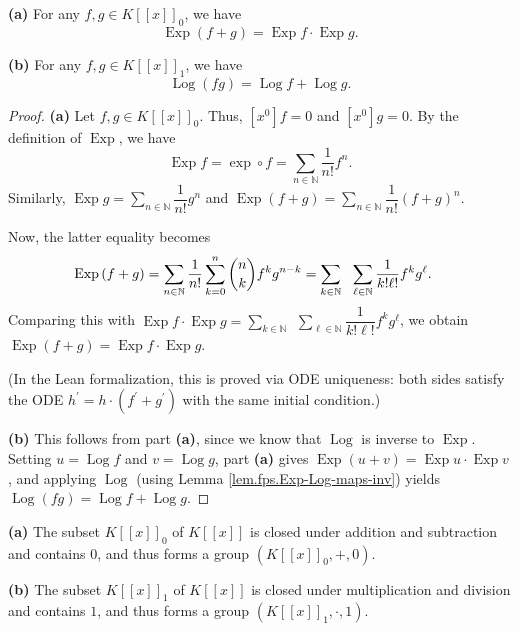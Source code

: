 \begin{lemma}
\label{lem.fps.Exp-Log-additive}
\leantarget
\leanok
\textbf{(a)} For any $f,g\in K\left[\left[
x\right]\right]_{0}$, we have
\[
\operatorname{Exp}\left(f+g\right)=\operatorname{Exp}f\cdot
\operatorname{Exp}g.
\]

\textbf{(b)} For any $f,g\in K\left[\left[x\right]\right]_{1}$, we
have
\[
\operatorname{Log}\left(fg\right)=\operatorname{Log}
f+\operatorname{Log}g.
\]
\end{lemma}

\begin{proof}
\textbf{(a)} Let $f,g\in K\left[\left[x\right]\right]_{0}$. Thus, $\left[
x^{0}\right]f=0$ and $\left[x^{0}\right]g=0$. By the definition of $\operatorname{Exp}$, we have
\[
\operatorname{Exp}f=\exp\circ f=\sum_{n\in\mathbb{N}
}\dfrac{1}{n!}f^{n}.
\]
Similarly, $\operatorname{Exp}g=\sum_{n\in\mathbb{N}}\dfrac{1}{n!}g^{n}$
and
$\operatorname{Exp}\left(f+g\right)=\sum_{n\in\mathbb{N}}\dfrac{1}
{n!}\left(f+g\right)^{n}$.

Now, the latter equality becomes
\begin{align*}
\operatorname{Exp}\left(f+g\right) &  =\sum_{n\in\mathbb{N}}\dfrac{1}
{n!}\sum\limits_{k=0}
^{n}\dbinom{n}{k}f^{k}g^{n-k}
=\sum_{k\in\mathbb{N}}\ \ \sum\limits_{\ell
\in\mathbb{N}}\dfrac{1}{k!\ell!}f^{k}g^{\ell}.
\end{align*}
Comparing this with
$\operatorname{Exp}f\cdot\operatorname{Exp}g
=\sum_{k\in\mathbb{N}}\ \ \sum_{\ell\in
\mathbb{N}}\dfrac{1}{k!\ell!}f^{k}g^{\ell}$,
we obtain $\operatorname{Exp}\left(f+g\right)=\operatorname{Exp}
f\cdot\operatorname{Exp}g$.

(In the Lean formalization, this is proved via ODE uniqueness:
both sides satisfy the ODE $h^{\prime} = h \cdot (f^{\prime} + g^{\prime})$ with the same initial condition.)

\textbf{(b)} This follows from part \textbf{(a)}, since we know that
$\operatorname{Log}$ is inverse to $\operatorname{Exp}$. Setting
$u=\operatorname{Log}f$ and $v=\operatorname{Log}g$, part \textbf{(a)}
gives $\operatorname{Exp}\left(u+v\right)=\operatorname{Exp}u\cdot\operatorname{Exp}v$,
and applying $\operatorname{Log}$ (using Lemma \ref{lem.fps.Exp-Log-maps-inv}) yields
$\operatorname{Log}\left(fg\right)=\operatorname{Log}f+\operatorname{Log}g$.
\end{proof}

\begin{proposition}
\label{prop.fps.Exp-Log-groups}
\leantarget
\leanok
\textbf{(a)} The subset $K\left[\left[
x\right]\right]_{0}$ of $K\left[\left[x\right]\right]$ is closed
under addition and subtraction and contains $0$, and thus forms a group
$\left(K\left[\left[x\right]\right]_{0},+,0\right)$. \medskip

\textbf{(b)} The subset $K\left[\left[x\right]\right]_{1}$ of
$K\left[\left[x\right]\right]$ is closed under multiplication and
division and contains $1$, and thus forms a group $\left(K\left[\left[
x\right]\right]_{1},\cdot,1\right)$.
\end{proposition}

